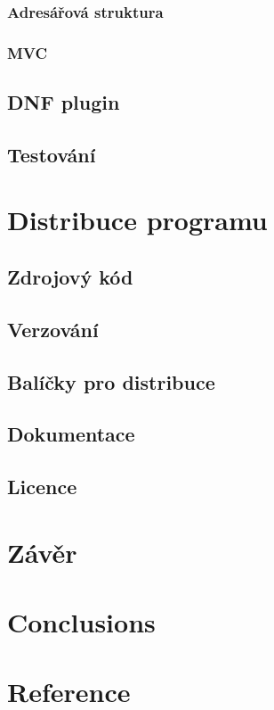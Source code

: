 \documentclass[10pt,a4paper]{article}
\begin{document}
			\subsubsection{Adresářová struktura}
			\subsubsection{MVC}

		\subsection{DNF plugin}
		\subsection{Testování}

	\section{Distribuce programu}
		\subsection{Zdrojový kód}
		\subsection{Verzování}
		\subsection{Balíčky pro distribuce}
		\subsection{Dokumentace}
		\subsection{Licence}

	\section{Závěr} %
	\section{Conclusions} %
	\section{Reference} %

\end{document}
